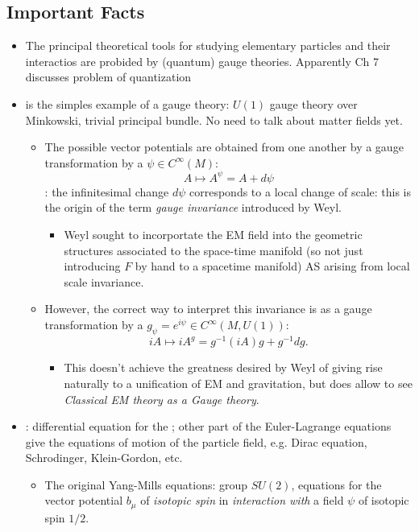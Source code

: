 \documentclass[12pt]{report}
\begin{document}
\subsection{Important Facts}
\begin{itemize}
    \item The principal theoretical tools for studying elementary particles and their interactios are probided by (quantum) gauge theories. Apparently Ch 7 discusses problem of quantization
    
    \item {} is the simples example of a gauge theory: $U(1)$ gauge theory over Minkowski, trivial principal bundle. No need to talk about matter fields yet.
    \begin{itemize}
        \item The possible vector potentials are obtained from one another by a gauge transformation by a $\psi \in C^\infty(M)$: \[A \mapsto A^\psi = A + d\psi\]: the infinitesimal change $d\psi$ corresponds to a local change of scale: this is the origin of the term \emph{gauge invariance} introduced by Weyl.
        \begin{itemize}
            \item Weyl sought to incorportate the EM field into the geometric structures associated to the space-time manifold (so not just introducing $F$ by hand to a spacetime manifold) AS arising from local scale invariance.
        \end{itemize}
        
        \item However, the correct way to interpret this invariance is as a gauge transformation by a $g_\psi = e^{i \psi} \in  C^\infty(M, U(1))$: \[iA \mapsto iA^g = g^{-1} (iA) g + g^{-1} dg.\]
        \begin{itemize}
            \item This doesn't achieve the greatness desired by Weyl of giving rise naturally to a unification of EM and gravitation, but does allow to see \emph{Classical EM theory as a Gauge theory}.
        \end{itemize}
    \end{itemize}
    
    \item {}: differential equation for the ; other part of the Euler-Lagrange equations give the equations of motion of the particle field, e.g. Dirac equation, Schrodinger, Klein-Gordon, etc.
    \begin{itemize}
        \item The original Yang-Mills equations: group $SU(2)$, equations for the vector potential $b_\mu$ of \emph{isotopic spin} in \emph{interaction with} a field $\psi$ of isotopic spin $1/2$.
        

\end{itemize}
\end{itemize}
\end{document}
